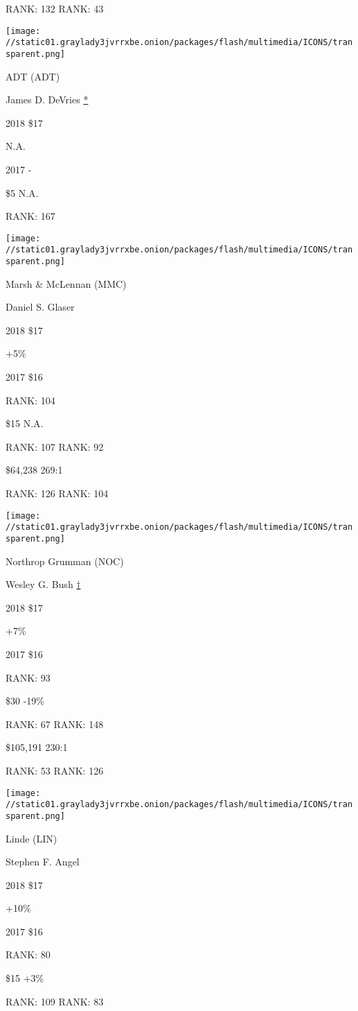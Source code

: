 RANK: 132 RANK: 43

\texttt{[image: //static01.graylady3jvrrxbe.onion/packages/flash/multimedia/ICONS/transparent.png]}

ADT (ADT)

James D. DeVries \protect\hyperlink{g-footnotes}{*}

2018 \$17

 N.A.

2017 -

 \$5 N.A.

RANK: 167

\texttt{[image: //static01.graylady3jvrrxbe.onion/packages/flash/multimedia/ICONS/transparent.png]}

Marsh \& McLennan (MMC)

Daniel S. Glaser \protect\hyperlink{g-footnotes}{}

2018 \$17

 +5\%

2017 \$16

RANK: 104

 \$15 N.A.

RANK: 107 RANK: 92

 \$64,238 269:1

RANK: 126 RANK: 104

\texttt{[image: //static01.graylady3jvrrxbe.onion/packages/flash/multimedia/ICONS/transparent.png]}

Northrop Grumman (NOC)

Wesley G. Bush \protect\hyperlink{g-footnotes}{†}

2018 \$17

 +7\%

2017 \$16

RANK: 93

 \$30 -19\%

RANK: 67 RANK: 148

 \$105,191 230:1

RANK: 53 RANK: 126

\texttt{[image: //static01.graylady3jvrrxbe.onion/packages/flash/multimedia/ICONS/transparent.png]}

Linde (LIN)

Stephen F. Angel \protect\hyperlink{g-footnotes}{}

2018 \$17

 +10\%

2017 \$16

RANK: 80

 \$15 +3\%

RANK: 109 RANK: 83

